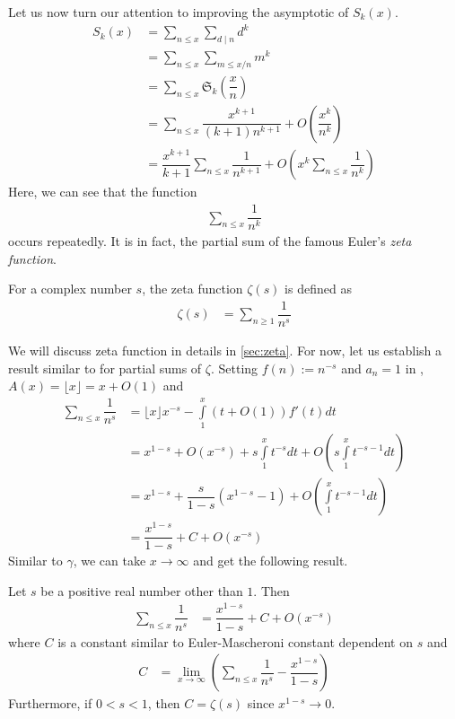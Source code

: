 \documentclass[elemannt.tex]{subfile}
\begin{document}
	Let us now turn our attention to improving the asymptotic of $S_{k}(x)$.
		\begin{align*}
			S_{k}(x)
				& = \sum_{n\leq x}\sum_{d\mid n}d^{k}\\
				& = \sum_{n\leq x}\sum_{m\leq x/n}m^{k}\\
				& = \sum_{n\leq x}\mathfrak{S}_{k}\left(\dfrac{x}{n}\right)\\
				& = \sum_{n\leq x}\dfrac{x^{k+1}}{(k+1)n^{k+1}}+O\left(\dfrac{x^{k}}{n^{k}}\right)\\
				& = \dfrac{x^{k+1}}{k+1}\sum_{n\leq x}\dfrac{1}{n^{k+1}}+O\left(x^{k}\sum_{n\leq x}\dfrac{1}{n^{k}}\right)
		\end{align*}
	Here, we can see that the function
		\begin{align*}
			\sum_{n\leq x}\dfrac{1}{n^{k}}
		\end{align*}
	occurs repeatedly. It is in fact, the partial sum of the famous Euler's \textit{zeta function}.
		\begin{definition}
			For a complex number $s$, the zeta function $\zeta(s)$ is defined as
				\begin{align*}
					\zeta(s)
						& = \sum_{n\geq 1}\dfrac{1}{n^{s}}
				\end{align*}
		\end{definition}
	We will discuss zeta function in details in \autoref{sec:zeta}. For now, let us establish a result similar to  for partial sums of $\zeta$. Setting $f(n):=n^{-s}$ and $a_{n}=1$ in , $A(x)=\lfloor{x}\rfloor=x+O(1)$ and
		\begin{align*}
			\sum_{n\leq x}\dfrac{1}{n^{s}}
				& = \lfloor{x}\rfloor x^{-s}-\int\limits_{1}^{x}(t+O(1))f'(t)dt\\
				& = x^{1-s}+O\left(x^{-s}\right)+s\int\limits_{1}^{x}t^{-s}dt+O\left(s\int\limits_{1}^{x}t^{-s-1}dt\right)\\
				& = x^{1-s}+\dfrac{s}{1-s}\left(x^{1-s}-1\right)+O\left(\int\limits_{1}^{x}t^{-s-1}dt\right)\\
				& = \dfrac{x^{1-s}}{1-s}+C+O(x^{-s})
		\end{align*}
	Similar to $\gamma$, we can take $x\to\infty$ and get the following result.
		\begin{theorem}
			Let $s$ be a positive real number other than $1$. Then
				\begin{align*}
					\sum_{n\leq x}\dfrac{1}{n^{s}}
						& = \dfrac{x^{1-s}}{1-s}+C+O(x^{-s})
				\end{align*}
			where $C$ is a constant similar to Euler-Mascheroni constant dependent on $s$ and
				\begin{align*}
					C
						& = \lim\limits_{x\to\infty}\left(\sum_{n\leq x}\dfrac{1}{n^{s}}-\dfrac{x^{1-s}}{1-s}\right)
				\end{align*}
			Furthermore, if $0<s<1$, then $C=\zeta(s)$ since $x^{1-s}\to 0$.
		\end{theorem}
\end{document}

